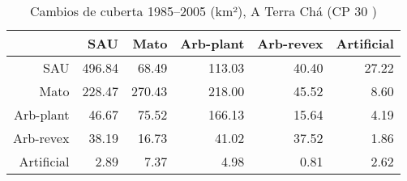 \begin{table}[p]
\centering
\caption{Cambios de cuberta 1985--2005 (km²), A Terra Chá (CP 30 )} 
\label{TaboaContinxCP30}
\begin{tabular}{rrrrrr}
  \hline
 & SAU & Mato & Arb-plant & Arb-revex & Artificial \\ 
  \hline
SAU & 496.84 & 68.49 & 113.03 & 40.40 & 27.22 \\ 
  Mato & 228.47 & 270.43 & 218.00 & 45.52 & 8.60 \\ 
  Arb-plant & 46.67 & 75.52 & 166.13 & 15.64 & 4.19 \\ 
  Arb-revex & 38.19 & 16.73 & 41.02 & 37.52 & 1.86 \\ 
  Artificial & 2.89 & 7.37 & 4.98 & 0.81 & 2.62 \\ 
   \hline
\end{tabular}
\end{table}

